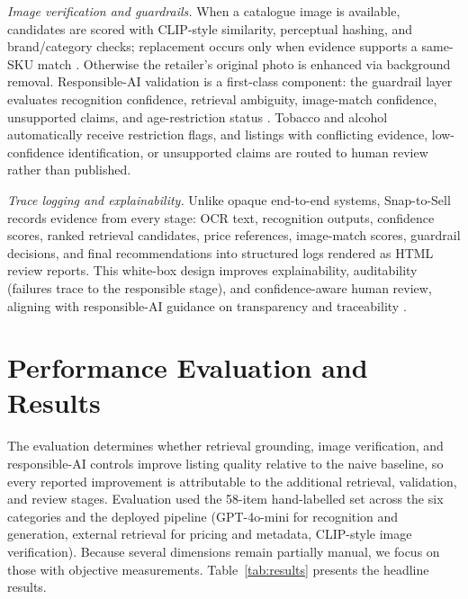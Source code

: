 \documentclass[conference]{IEEEtran}
\begin{document}
\textit{Image verification and guardrails.} When a catalogue image is available,
candidates are scored with CLIP-style similarity, perceptual hashing, and
brand/category checks; replacement occurs only when evidence supports a same-SKU
match \cite{sir2020,eclip2022}. Otherwise the retailer's original photo is
enhanced via background removal. Responsible-AI validation is a first-class
component: the guardrail layer evaluates recognition confidence, retrieval
ambiguity, image-match confidence, unsupported claims, and age-restriction
status \cite{li2024modict}. Tobacco and alcohol automatically receive
restriction flags, and listings with conflicting evidence, low-confidence
identification, or unsupported claims are routed to human review rather than
published.

\textit{Trace logging and explainability.} Unlike opaque end-to-end systems,
Snap-to-Sell records evidence from every stage: OCR text, recognition outputs,
confidence scores, ranked retrieval candidates, price references, image-match
scores, guardrail decisions, and final recommendations into structured logs
rendered as HTML review reports. This white-box design improves explainability,
auditability (failures trace to the responsible stage), and confidence-aware
human review, aligning with responsible-AI guidance on transparency and
traceability \cite{li2024modict}.

\section{Performance Evaluation and Results}

The evaluation determines whether retrieval grounding, image verification, and
responsible-AI controls improve listing quality relative to the naive baseline,
so every reported improvement is attributable to the additional retrieval,
validation, and review stages. Evaluation used the 58-item hand-labelled set
across the six categories and the deployed pipeline (GPT-4o-mini for recognition
and generation, external retrieval for pricing and metadata, CLIP-style image
verification). Because several dimensions remain partially manual, we focus on
those with objective measurements. Table~\ref{tab:results} presents the headline
results.
\end{document}
